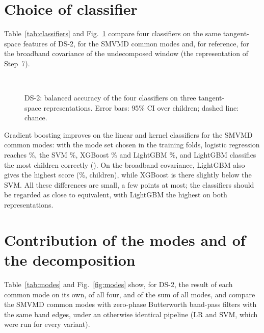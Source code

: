 \begin{table}[H]
\caption{Common-mode set chosen by the inner cross-validation in the outer folds.}
\label{tab:chosen}\centering
{}
\end{table}

\section{Choice of classifier}
Table~\ref{tab:classifiers} and Fig.~\ref{fig:classifiers} compare four classifiers on the same
tangent-space features of DS-2, for the SMVMD common modes and, for reference, for the broadband
covariance of the undecomposed window (the representation of Step~7).

\begin{table}[H]
\caption{DS-2: classifier comparison on tangent-space features. Balanced window accuracy (\%),
AUC, and children correct.}
\label{tab:classifiers}\centering
{}\\[2pt]
{\footnotesize \dstwonote}
\end{table}

\begin{figure}[H]\centering
{}
\caption{DS-2: balanced accuracy of the four classifiers on three tangent-space representations.
Error bars: 95\% CI over children; dashed line: chance.}
\label{fig:classifiers}
\end{figure}

Gradient boosting improves on the linear and kernel classifiers for the SMVMD common modes: with
the mode set chosen in the training folds, logistic regression reaches \%, the
SVM \%, XGBoost \% and LightGBM \%, and
LightGBM classifies the most children correctly (). On the broadband
covariance, LightGBM also gives the highest score (\%, 
children), while XGBoost is there slightly below the SVM. All these differences are small, a few
points at most; the classifiers should be regarded as close to equivalent, with LightGBM the
highest on both representations.

\section{Contribution of the modes and of the decomposition}
Table~\ref{tab:modes} and Fig.~\ref{fig:modes} show, for DS-2, the result of each common mode on
its own, of all four, and of the sum of all modes, and compare the SMVMD common modes with
zero-phase Butterworth band-pass filters with the same band edges, under an otherwise identical
pipeline (LR and SVM, which were run for every variant).


